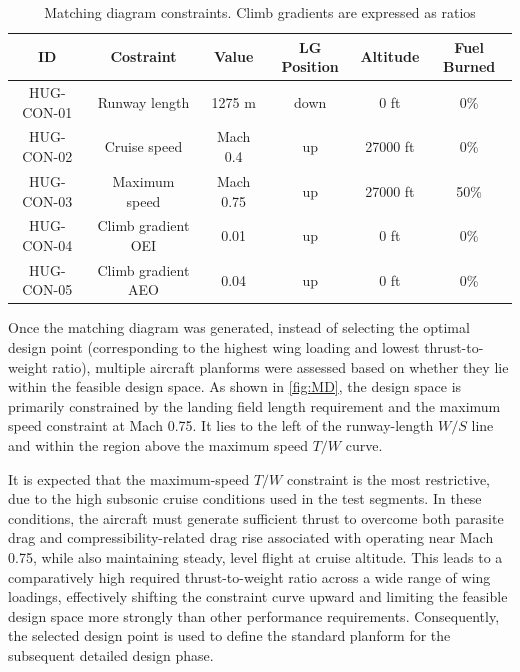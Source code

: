 \begin{table}[h]
\centering
\caption{Matching diagram constraints. Climb gradients are expressed as ratios }
\label{tab: Matching diagram constraints}
\begin{tabular}
{|c|c|c|c|c|c|}
    \hline
    \textbf{ID} & \textbf{Costraint} & \textbf{Value} & \textbf{LG Position} & \textbf{Altitude} & \textbf{Fuel Burned} \\
    \hline\hline
    HUG-CON-01 & Runway length & 1275 m& down & 0 ft & 0\% \\
    \hline
    HUG-CON-02 & Cruise speed & Mach 0.4 & up & 27000 ft & 0\% \\
    \hline
    HUG-CON-03 & Maximum speed & Mach 0.75 & up & 27000 ft & 50\% \\
    \hline
    HUG-CON-04 & Climb gradient OEI & 0.01 & up & 0 ft & 0\% \\
    \hline
    HUG-CON-05 & Climb gradient AEO & 0.04 & up & 0 ft& 0\% \\
    \hline
    \end{tabular}
\end{table}

Once the matching diagram was generated, instead of selecting the optimal design point (corresponding to the highest wing loading and lowest thrust-to-weight ratio), multiple aircraft planforms were assessed based on whether they lie within the feasible design space. As shown in \autoref{fig:MD}, the design space is primarily constrained by the landing field length requirement and the maximum speed constraint at Mach 0.75. It lies to the left of the runway-length $W/S$ line and within the region above the maximum speed $T/W$ curve.

It is expected that the maximum-speed $T/W$ constraint is the most restrictive, due to the high subsonic cruise conditions used in the test segments. In these conditions, the aircraft must generate sufficient thrust to overcome both parasite drag and compressibility-related drag rise associated with operating near Mach 0.75, while also maintaining steady, level flight at cruise altitude. This leads to a comparatively high required thrust-to-weight ratio across a wide range of wing loadings, effectively shifting the constraint curve upward and limiting the feasible design space more strongly than other performance requirements. Consequently, the selected design point is used to define the standard planform for the subsequent detailed design phase.


